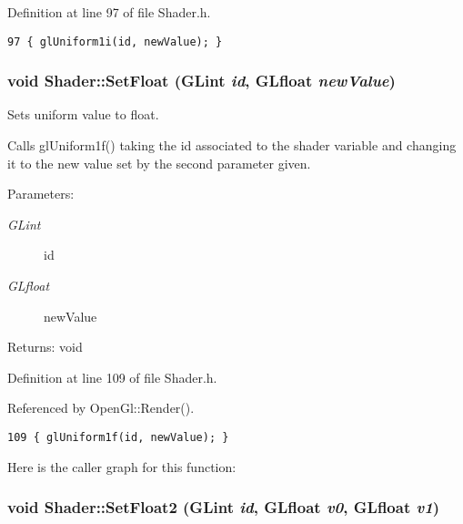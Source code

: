 Definition at line 97 of file Shader.h.

\begin{Code}\begin{verbatim}97 { glUniform1i(id, newValue); }
\end{verbatim}
\end{Code}


\hypertarget{class_shader_df02f121177b2723321441701361fab4}{
\subsubsection[SetFloat]{\setlength{\rightskip}{0pt plus 5cm}void Shader::SetFloat (GLint {\em id}, \/  GLfloat {\em newValue})}}
\label{class_shader_df02f121177b2723321441701361fab4}


Sets uniform value to float. 

Calls glUniform1f() taking the id associated to the shader variable and changing it to the new value set by the second parameter given.

\begin{Desc}
\item[Parameters:]
\begin{description}
\item[{\em GLint}]id \item[{\em GLfloat}]newValue \end{description}
\end{Desc}
\begin{Desc}
\item[Returns:]void \end{Desc}


Definition at line 109 of file Shader.h.

Referenced by OpenGl::Render().

\begin{Code}\begin{verbatim}109 { glUniform1f(id, newValue); }
\end{verbatim}
\end{Code}




Here is the caller graph for this function:\hypertarget{class_shader_8c50bc3b65790489f1538867face7b81}{
\subsubsection[SetFloat2]{\setlength{\rightskip}{0pt plus 5cm}void Shader::SetFloat2 (GLint {\em id}, \/  GLfloat {\em v0}, \/  GLfloat {\em v1})}}
\label{class_shader_8c50bc3b65790489f1538867face7b81}


